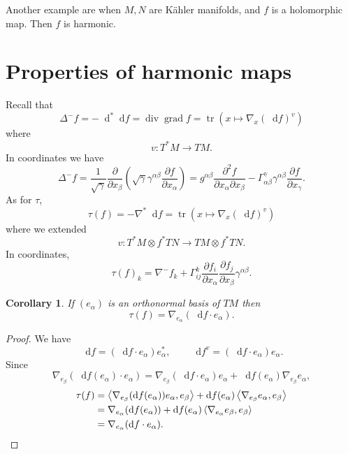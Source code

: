 \documentclass[reqno,12pt,letterpaper]{amsart}
\newcommand{\tr}{\operatorname{tr}}
\newcommand*\dif{\mathop{}\!\mathrm{d}}
\DeclareMathOperator{\Div}{div}
\DeclareMathOperator{\grad}{grad}
\newcommand{\parl}{\left(}
\newcommand{\parr}{\right)}
\newcommand{\bral}{\left\langle}
\newcommand{\brar}{\right\rangle}
\newtheorem{corollary}[theorem]{Corollary}
\theoremstyle{definition}
\numberwithin{equation}{section}
\begin{document}
Another example are when $M, N$ are K\"ahler manifolds, and $f$ is a holomorphic map. Then $f$ is harmonic.

\section{Properties of harmonic maps}
Recall that 
$$\Delta^- f = - \dif^* \dif f = \Div \grad f = \tr(x \mapsto \nabla_x (\dif f)^v)$$
where 
$$v: T^*M \to TM.$$
In coordinates we have 
$$\Delta^- f = \frac{1}{\sqrt \gamma} \frac{\partial}{\partial x_\beta} \parl \sqrt \gamma \gamma^{\alpha \beta} \frac{\partial f}{\partial x_\alpha} \parr = g^{\alpha \beta} \frac{\partial^2 f}{\partial x_\alpha \partial x_\beta} - \Gamma_{\alpha \beta}^\gamma \gamma^{\alpha \beta} \frac{\partial f}{\partial x_\gamma}.$$
As for $\tau$,
$$\tau(f) = -\nabla^* \dif f = \tr(x \mapsto \nabla_x (\dif f)^v)$$
where we extended
$$v: T^* M \otimes f^* TN \to TM \otimes f^* TN.$$
In coordinates,
$$\tau(f)_k = \nabla^- f_k + \Gamma_{ij}^k \frac{\partial f_i}{\partial x_\alpha} \frac{\partial f_j}{\partial x_\beta} \gamma^{\alpha \beta}.$$

\begin{corollary}
If $(e_\alpha)$ is an orthonormal basis of $TM$ then 
$$\tau(f) = \nabla_{e_\alpha} (\dif f \cdot e_\alpha).$$
\end{corollary}
\begin{proof}
We have 
$$\dif f = (\dif f \cdot e_\alpha) e_\alpha^*, \qquad \dif f^v = (\dif f \cdot e_\alpha) e_\alpha.$$
Since 
$$\nabla_{e_\beta}(\dif f(e_\alpha) \cdot e_\alpha) = \nabla_{e_\beta} (\dif f \cdot e_\alpha) e_\alpha + \dif f (e_\alpha) \nabla_{e_\beta} e_\alpha,$$
\begin{align*}
\tau(f) &= \bral \nabla_{e_\beta}(\dif f(e_\alpha)) e_\alpha, e_\beta \brar + \dif f(e_\alpha) \bral \nabla_{e_\beta} e_\alpha, e_\beta \brar \\
&= \nabla_{e_\alpha}(\dif f(e_\alpha)) + \dif f(e_\alpha) \bral \nabla_{e_\alpha} e_\beta, e_\beta \brar \\
&= \nabla_{e_\alpha}(\dif f \cdot e_\alpha). \qedhere 
\end{align*}
\end{proof}
\end{document}
